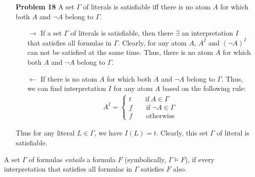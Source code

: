 \begin{enumerate}
\item[\textbf{Problem 18}] A set $\Gamma$ of literals is satisfiable iff there is no atom $A$ for which both $A$ and $\neg A$ belong to $\Gamma$. 
\begin{itemize}
\item[$\rightarrow$] If a set $\Gamma$ of literals is satisfiable, then there $\exists$ an interpretation $I$ that satisfies all formulas in $\Gamma$. Clearly, for any atom $A$, $A^I$ and $(\neg A)^I$ can not be satisfied at the same time. Thus, there is no atom $A$ for which both $A$ and $\neg A$ belong to $\Gamma$.
\item[$\leftarrow$] If there is no atom $A$ for which both $A$ and $\neg A$ belong to $\Gamma$. Thus, we can find interpretation $I$ for any atom $A$ based on the following rule:
\begin{gather*}
A^I =  \left\{
        \begin{array}{c}      
        t \qquad \text{if} \: A \in \Gamma \\
        f \qquad \text{if} \; \neg A \in \Gamma \\
        f \qquad \text{otherwise}
        \end{array}\right.
\end{gather*}
\end{itemize}
Thus for any literal $L \in \Gamma$, we have $I(L) = t$. Clearly, this set $\Gamma$ of literal is satisfiable. 

\end{enumerate}



\noindent A set $\Gamma$ of formulas \textit{entails} a formula $F$ (symbolically, $\Gamma \models F$), if every interpretation that satisfies all formulas in $\Gamma$ satisfies $F$ also. 

